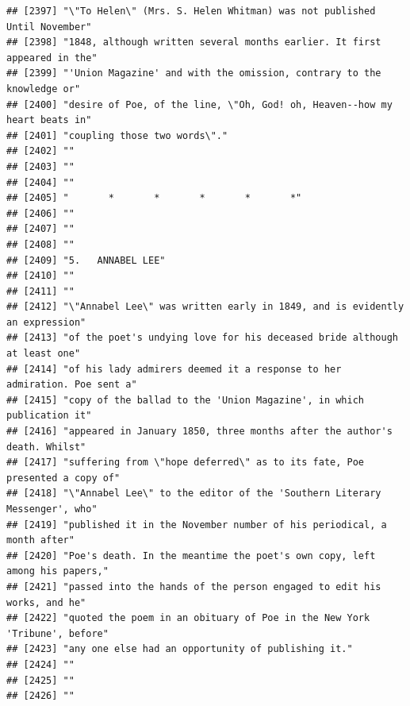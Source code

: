 \documentclass{article}\usepackage[]{graphicx}\usepackage[]{color}
\makeatletter
\newenvironment{kframe}{%
 \def\at@end@of@kframe{}%
 \ifinner\ifhmode%
  \def\at@end@of@kframe{\end{minipage}}%
  \begin{minipage}{\columnwidth}%
 \fi\fi%
 \def\FrameCommand##1{\hskip\@totalleftmargin \hskip-\fboxsep
 \colorbox{shadecolor}{##1}\hskip-\fboxsep
     \hskip-\linewidth \hskip-\@totalleftmargin \hskip\columnwidth}%
 \MakeFramed {\advance\hsize-\width
   \@totalleftmargin\z@ \linewidth\hsize
   \@setminipage}}%
 {\par\unskip\endMakeFramed%
 \at@end@of@kframe}
\newenvironment{knitrout}{}{} %
\makeatother
\begin{document}
\begin{knitrout}
\begin{kframe}
\begin{verbatim}
## [2397] "\"To Helen\" (Mrs. S. Helen Whitman) was not published Until November"       
## [2398] "1848, although written several months earlier. It first appeared in the"     
## [2399] "'Union Magazine' and with the omission, contrary to the knowledge or"        
## [2400] "desire of Poe, of the line, \"Oh, God! oh, Heaven--how my heart beats in"    
## [2401] "coupling those two words\"."                                                 
## [2402] ""                                                                            
## [2403] ""                                                                            
## [2404] ""                                                                            
## [2405] "       *       *       *       *       *"                                    
## [2406] ""                                                                            
## [2407] ""                                                                            
## [2408] ""                                                                            
## [2409] "5.   ANNABEL LEE"                                                            
## [2410] ""                                                                            
## [2411] ""                                                                            
## [2412] "\"Annabel Lee\" was written early in 1849, and is evidently an expression"   
## [2413] "of the poet's undying love for his deceased bride although at least one"     
## [2414] "of his lady admirers deemed it a response to her admiration. Poe sent a"     
## [2415] "copy of the ballad to the 'Union Magazine', in which publication it"         
## [2416] "appeared in January 1850, three months after the author's death. Whilst"     
## [2417] "suffering from \"hope deferred\" as to its fate, Poe presented a copy of"    
## [2418] "\"Annabel Lee\" to the editor of the 'Southern Literary Messenger', who"     
## [2419] "published it in the November number of his periodical, a month after"        
## [2420] "Poe's death. In the meantime the poet's own copy, left among his papers,"    
## [2421] "passed into the hands of the person engaged to edit his works, and he"       
## [2422] "quoted the poem in an obituary of Poe in the New York 'Tribune', before"     
## [2423] "any one else had an opportunity of publishing it."                           
## [2424] ""                                                                            
## [2425] ""                                                                            
## [2426] ""                                                                            

\end{verbatim}
\end{kframe}
\end{knitrout}
\end{document}
